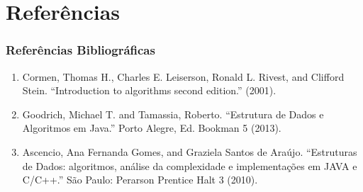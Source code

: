 \documentclass{beamer}
\begin{document}
\section{Referências}

\begin{frame}
    \frametitle{Referências Bibliográficas}
    \begin{enumerate}
        \item Cormen, Thomas H., Charles E. Leiserson, Ronald L. Rivest, and Clifford Stein. ``Introduction to algorithms second edition.'' (2001).
        \item Goodrich, Michael T. and Tamassia, Roberto. ``Estrutura de Dados e Algoritmos em Java.'' Porto Alegre, Ed. Bookman 5 (2013).
        \item Ascencio, Ana Fernanda Gomes, and Graziela Santos de Araújo. ``Estruturas de Dados: algoritmos, análise da complexidade e implementações em JAVA e C/C++.'' São Paulo: Perarson Prentice Halt 3 (2010).
    \end{enumerate}
\end{frame}
\end{document}
